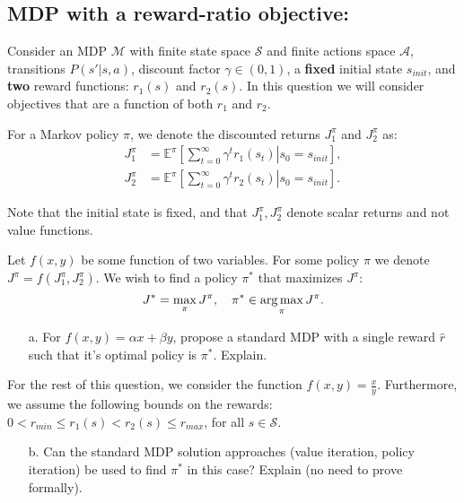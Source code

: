 \subsection{MDP with a reward-ratio objective:}
Consider an MDP $\mathcal{M}$ with finite state space $\mathcal{S}$ and finite actions space $\mathcal{A}$, transitions $P(s'|s,a)$, discount factor $\gamma\in (0,1)$, a \textbf{fixed} initial state $s_{init}$, and \textbf{two} reward functions: $r_1(s)$ and $r_2(s)$. In this question we will consider objectives that are a function of both $r_1$ and $r_2$.

For a Markov policy $\pi$, we denote the discounted returns $J_1^\pi$ and $J_2^\pi$ as:
\begin{equation*}
\begin{split}
    J_1^\pi &= \mathbb{E}^\pi \left[\left. \sum_{t=0}^\infty \gamma^t r_1(s_t)\right|s_0 = s_{init}\right], \\
    J_2^\pi &= \mathbb{E}^\pi \left[ \left.\sum_{t=0}^\infty \gamma^t r_2(s_t)\right|s_0 = s_{init}\right].
\end{split}
\end{equation*}

Note that the initial state is fixed, and that $J_1^\pi, J_2^\pi$ denote scalar returns and not value functions.

Let $f(x,y)$ be some function of two variables. For some policy $\pi$ we denote $J^\pi = f(J_1^\pi, J_2^\pi).$ We wish to find a policy $\pi^*$ that maximizes $J^\pi$:
\begin{equation*}
    J^* = \max_{\pi} J^\pi, \quad \pi^* \in \argmax_{\pi} J^\pi.
\end{equation*}

\begin{itemize}
    \item[a.] For $f(x,y)=\alpha x +\beta y$, propose a standard MDP with a single reward $\hat{r}$ such that it's optimal policy is $\pi^*$. Explain.
\end{itemize}

For the rest of this question, we consider the function $f(x,y) = \frac{x}{y}$. Furthermore, we assume the following bounds on the rewards: $0<r_{min}\leq r_1(s) < r_2(s) \leq r_{max}$, for all $s\in\mathcal{S}$. 

\begin{itemize}
    \item[b.] Can the standard MDP solution approaches (value iteration, policy iteration) be used to find $\pi^*$ in this case? Explain (no need to prove formally).
\end{itemize}

